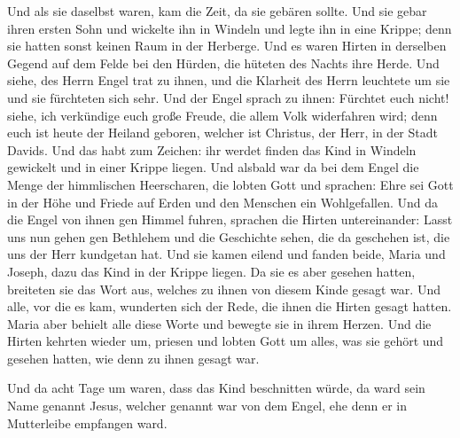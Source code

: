  Und als sie daselbst waren, kam die Zeit, da sie gebären
sollte.  Und sie gebar ihren ersten Sohn und wickelte ihn
in Windeln und legte ihn in eine Krippe; denn sie hatten sonst keinen
Raum in der Herberge.  Und es waren Hirten in derselben
Gegend auf dem Felde bei den Hürden, die hüteten des Nachts ihre Herde.
 Und siehe, des Herrn Engel trat zu ihnen, und die
Klarheit des Herrn leuchtete um sie und sie fürchteten sich sehr.
 Und der Engel sprach zu ihnen: Fürchtet euch nicht!
siehe, ich verkündige euch große Freude, die allem Volk widerfahren
wird;  denn euch ist heute der Heiland geboren, welcher
ist Christus, der Herr, in der Stadt Davids.  Und das
habt zum Zeichen: ihr werdet finden das Kind in Windeln gewickelt und in
einer Krippe liegen.  Und alsbald war da bei dem Engel
die Menge der himmlischen Heerscharen, die lobten Gott und sprachen:
 Ehre sei Gott in der Höhe und Friede auf Erden und den
Menschen ein Wohlgefallen.  Und da die Engel von ihnen
gen Himmel fuhren, sprachen die Hirten untereinander: Lasst uns nun
gehen gen Bethlehem und die Geschichte sehen, die da geschehen ist, die
uns der Herr kundgetan hat.  Und sie kamen eilend und
fanden beide, Maria und Joseph, dazu das Kind in der Krippe liegen.
 Da sie es aber gesehen hatten, breiteten sie das Wort
aus, welches zu ihnen von diesem Kinde gesagt war.  Und
alle, vor die es kam, wunderten sich der Rede, die ihnen die Hirten
gesagt hatten.  Maria aber behielt alle diese Worte und
bewegte sie in ihrem Herzen.  Und die Hirten kehrten
wieder um, priesen und lobten Gott um alles, was sie gehört und gesehen
hatten, wie denn zu ihnen gesagt war.

 Und da acht Tage um waren, dass das Kind beschnitten
würde, da ward sein Name genannt Jesus, welcher genannt war von dem
Engel, ehe denn er in Mutterleibe empfangen ward.

